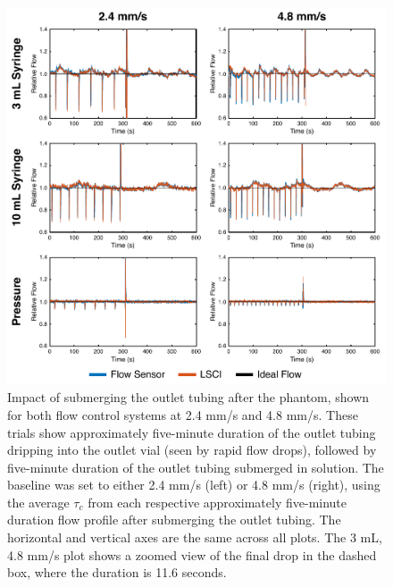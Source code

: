 \documentclass{article}
\begin{document}
\begin{figure}
    \includegraphics[width=\textwidth]{FigureS1.pdf}
    \caption {
        Impact of submerging the outlet tubing after the phantom, shown for both flow control systems at 2.4 mm/s and 4.8 mm/s. These trials show approximately five-minute duration of the outlet tubing dripping into the outlet vial (seen by rapid flow drops), followed by five-minute duration of the outlet tubing submerged in solution. The baseline was set to either 2.4 mm/s (left) or 4.8 mm/s (right), using the average $\tau_{c}$ from each respective approximately five-minute duration flow profile after submerging the outlet tubing. The horizontal and vertical axes are the same across all plots. The 3 mL, 4.8 mm/s plot shows a zoomed view of the final drop in the dashed box, where the duration is 11.6 seconds.
    }
    \label{fig:supplement_outlet}
\end{figure}
\end{document}

